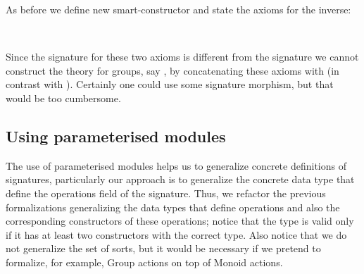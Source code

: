 As before we define new smart-constructor and state the axioms for the inverse:
\begin{code}
\>[0]\AgdaSpace{}%
\AgdaSymbol{=}\AgdaSpace{}%
\AgdaSpace{}%
\AgdaSymbol{(}\AgdaSpace{}%
\AgdaSpace{}%
\AgdaSymbol{(}\AgdaSpace{}%
\AgdaSymbol{))}\AgdaSpace{}%
\AgdaSpace{}%
\<%
%
\\
\>[0]\AgdaSpace{}%
\AgdaSymbol{=}\AgdaSpace{}%
\AgdaSpace{}%
\AgdaSymbol{((}\AgdaSpace{}%
\AgdaSymbol{)}\AgdaSpace{}%
\AgdaSpace{}%
\AgdaSymbol{)}\AgdaSpace{}%
\AgdaSpace{}%
\<
\end{code}
Since the signature for these two axioms is different from the
signature  we cannot construct the theory for
groups, say , by concatenating these axioms
with  (in contrast with
). Certainly one could use some signature
morphism, but that would be too cumbersome.

\subsection{Using parameterised modules}

The use of parameterised modules helps us to generalize concrete
definitions of signatures, particularly our approach is to generalize
the concrete data type that define the operations field of the
signature. Thus, we refactor the previous formalizations generalizing
the data types that define operations and also the corresponding
constructors of these operations; notice that the type
 is valid only if it has at least two
constructors with the correct type. Also notice that we do not
generalize the set of sorts, but it would be necessary if we pretend
to formalize, for example, Group actions on top of Monoid actions.

